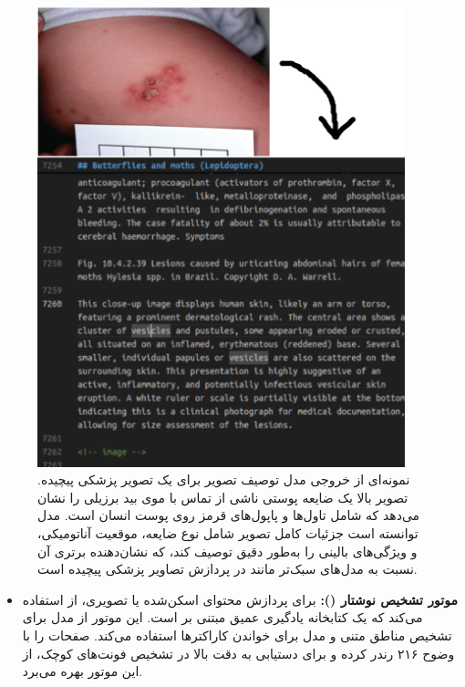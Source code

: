 \begin{figure}[!htbp]
    \centering
    \includegraphics[width=0.95\textwidth]{picture_description.png}
    \caption{نمونه‌ای از خروجی مدل توصیف تصویر  برای یک تصویر پزشکی پیچیده. تصویر بالا یک ضایعه پوستی ناشی از تماس با موی بید برزیلی را نشان می‌دهد که شامل تاول‌ها و پاپول‌های قرمز روی پوست انسان است. مدل  توانسته است جزئیات کامل تصویر شامل نوع ضایعه، موقعیت آناتومیکی، و ویژگی‌های بالینی را به‌طور دقیق توصیف کند، که نشان‌دهنده برتری آن نسبت به مدل‌های سبک‌تر مانند  در پردازش تصاویر پزشکی پیچیده است.}
    \label{fig:picture_description}
\end{figure}

\begin{itemize}
    \item \textbf{موتور تشخیص نوشتار ():} برای پردازش محتوای اسکن‌شده یا تصویری،  از  استفاده می‌کند که یک کتابخانه یادگیری عمیق مبتنی بر  است. این موتور از مدل  برای تشخیص مناطق متنی و مدل  برای خواندن کاراکترها استفاده می‌کند.  صفحات را با وضوح ۲۱۶  رندر کرده و برای دستیابی به دقت بالا در تشخیص فونت‌های کوچک، از این موتور بهره می‌برد.
\end{itemize}


